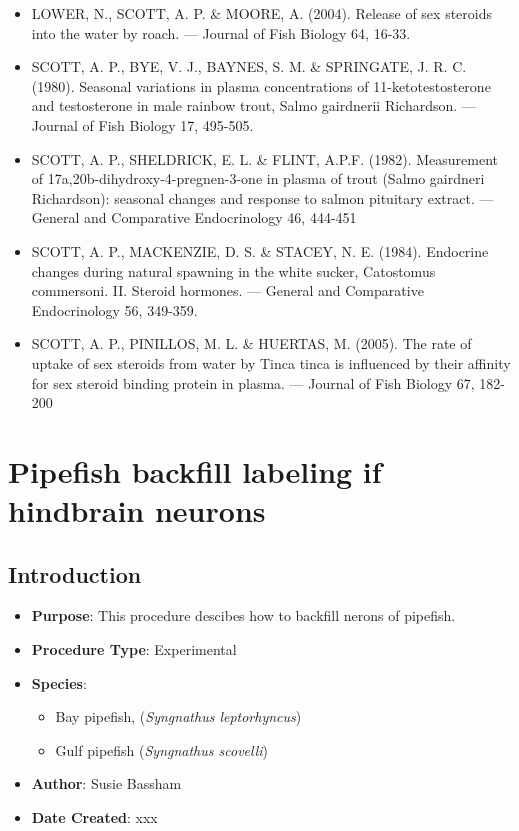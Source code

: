 \documentclass[
  letterpaper,
  DIV=11,
  numbers=noendperiod]{scrreprt}
\providecommand{\tightlist}{%
  \setlength{\itemsep}{0pt}\setlength{\parskip}{0pt}}\usepackage{longtable,booktabs,array}
\begin{document}
\begin{itemize}
\tightlist
\item
  LOWER, N., SCOTT, A. P. \& MOORE, A. (2004). Release of sex steroids
  into the water by roach. --- Journal of Fish Biology 64, 16-33.
\item
  SCOTT, A. P., BYE, V. J., BAYNES, S. M. \& SPRINGATE, J. R. C. (1980).
  Seasonal variations in plasma concentrations of 11-ketotestosterone
  and testosterone in male rainbow trout, Salmo gairdnerii Richardson.
  --- Journal of Fish Biology 17, 495-505.
\item
  SCOTT, A. P., SHELDRICK, E. L. \& FLINT, A.P.F. (1982). Measurement of
  17a,20b-dihydroxy-4-pregnen-3-one in plasma of trout (Salmo gairdneri
  Richardson): seasonal changes and response to salmon pituitary
  extract. --- General and Comparative Endocrinology 46, 444-451
\item
  SCOTT, A. P., MACKENZIE, D. S. \& STACEY, N. E. (1984). Endocrine
  changes during natural spawning in the white sucker, Catostomus
  commersoni. II. Steroid hormones. --- General and Comparative
  Endocrinology 56, 349-359.
\item
  SCOTT, A. P., PINILLOS, M. L. \& HUERTAS, M. (2005). The rate of
  uptake of sex steroids from water by Tinca tinca is influenced by
  their affinity for sex steroid binding protein in plasma. --- Journal
  of Fish Biology 67, 182-200
\end{itemize}

\hypertarget{sec-vert_exp-syngnathid}{%
\chapter{Pipefish backfill labeling if hindbrain
neurons}\label{sec-vert_exp-syngnathid}}

\hypertarget{introduction-61}{%
\section{Introduction}\label{introduction-61}}

\begin{itemize}
\tightlist
\item
  \textbf{Purpose}: This procedure descibes how to backfill nerons of
  pipefish.
\item
  \textbf{Procedure Type}: Experimental
\item
  \textbf{Species}:

  \begin{itemize}
  \tightlist
  \item
    Bay pipefish, (\emph{Syngnathus leptorhyncus})
  \item
    Gulf pipefish (\emph{Syngnathus scovelli})
  \end{itemize}
\item
  \textbf{Author}: Susie Bassham
\item
  \textbf{Date Created}: xxx
\end{itemize}
\end{document}
